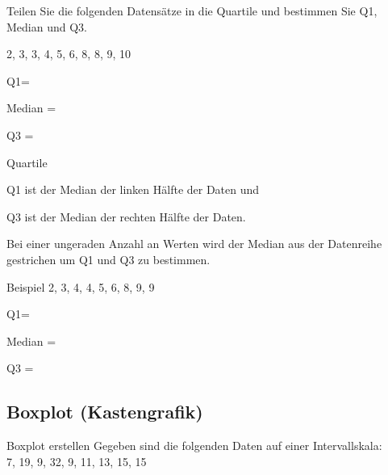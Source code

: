Teilen Sie die folgenden Datensätze in die Quartile und bestimmen Sie
Q1, Median und Q3.

2, 3, 3, 4, 5, 6, 8, 8, 9, 10

Q1= 

Median = 

Q3 = 

\begin{rezept}{Quartile}{}
  
  Q1 ist der Median der linken Hälfte der Daten und

  Q3 ist der Median der rechten
  Hälfte der Daten.

  Bei einer ungeraden Anzahl an Werten wird der Median aus der
  Datenreihe gestrichen um Q1 und Q3 zu bestimmen.
\end{rezept}


Beispiel
2, 3, 4, 4, 5, 6, 8, 9, 9

Q1= 

Median = 

Q3 = 



\newpage
\subsection{Boxplot (Kastengrafik)}

\begin{beispiel}{Boxplot erstellen}{}
  Gegeben sind die folgenden Daten auf einer Intervallskala:\\
  7, 19, 9, 32, 9, 11, 13, 15, 15
\end{beispiel}

